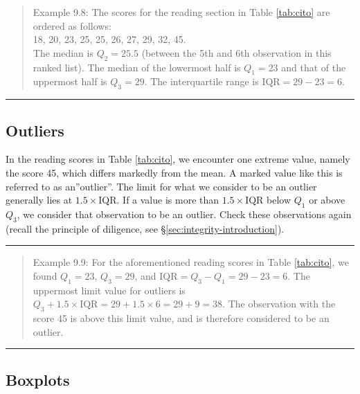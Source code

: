 \documentclass[
]{book}
\begin{document}
\begin{quote}
Example 9.8:
The scores for the reading section in
Table \ref{tab:cito} are
ordered as follows:\\
18, 20, 23, 25, 25, 26, 27, 29, 32, 45.\\
The median is \(Q_2=25.5\) (between the 5th and 6th observation in this
ranked list). The median of the lowermost half is \(Q_1=23\) and that of the
uppermost half is \(Q_3=29\). The interquartile range is
\(\textrm{IQR}=29-23=6\).
\end{quote}

\begin{center}\rule{0.5\linewidth}{0.5pt}\end{center}

\hypertarget{sec:outliers}{%
\subsection{Outliers}\label{sec:outliers}}

In the reading scores in Table \ref{tab:cito}, we encounter one extreme value, namely the score 45, which differs markedly from the mean. A marked value like this is referred to as an''outlier''. The limit for what we consider to be an outlier
generally lies at \(1.5 \times \textrm{IQR}\). If a value is more than
\(1.5 \times \textrm{IQR}\) below \(Q_1\) or above \(Q_3\), we consider that
observation to be an outlier. Check these observations again (recall the principle of diligence, see §\ref{sec:integrity-introduction}).

\begin{center}\rule{0.5\linewidth}{0.5pt}\end{center}

\begin{quote}
Example 9.9:
For the aforementioned reading scores in
Table \ref{tab:cito}, we found
\(Q_1=23\), \(Q_3=29\), and \(\textrm{IQR}=Q_3-Q_1=29-23=6\). The uppermost
limit value for outliers is
\(Q_3 + 1.5 \times \textrm{IQR} = 29 + 1.5 \times 6 = 29+9 = 38\). The
observation with the score 45 is above this limit value, and is therefore
considered to be an outlier.
\end{quote}

\begin{center}\rule{0.5\linewidth}{0.5pt}\end{center}

\hypertarget{sec:boxplot}{%
\subsection{Boxplots}\label{sec:boxplot}}
\end{document}
